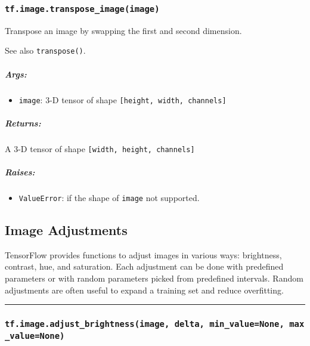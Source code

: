 \subsubsection{\texorpdfstring{\texttt{tf.image.transpose\_image(image)}
}{tf.image.transpose\_image(image) }}\label{tf.image.transposeux5fimageimage}

Transpose an image by swapping the first and second dimension.

See also \texttt{transpose()}.

\subparagraph{Args: }\label{args-18}

\begin{itemize}
\tightlist
\item
  \texttt{image}: 3-D tensor of shape
  \texttt{{[}height,\ width,\ channels{]}}
\end{itemize}

\subparagraph{Returns: }\label{returns-18}

A 3-D tensor of shape \texttt{{[}width,\ height,\ channels{]}}

\subparagraph{Raises: }\label{raises-8}

\begin{itemize}
\tightlist
\item
  \texttt{ValueError}: if the shape of \texttt{image} not supported.
\end{itemize}

\subsection{Image Adjustments }\label{image-adjustments}

TensorFlow provides functions to adjust images in various ways:
brightness, contrast, hue, and saturation. Each adjustment can be done
with predefined parameters or with random parameters picked from
predefined intervals. Random adjustments are often useful to expand a
training set and reduce overfitting.

\begin{center}\rule{0.5\linewidth}{\linethickness}\end{center}

\subsubsection{\texorpdfstring{\texttt{tf.image.adjust\_brightness(image,\ delta,\ min\_value=None,\ max\_value=None)}
}{tf.image.adjust\_brightness(image, delta, min\_value=None, max\_value=None) }}\label{tf.image.adjustux5fbrightnessimage-delta-minux5fvaluenone-maxux5fvaluenone}


